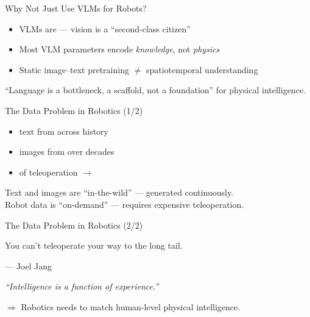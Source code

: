 \begin{frame}{Why Not Just Use VLMs for Robots?}
\begin{itemize}
    \item VLMs are  ---
          vision is a ``second-class citizen''
    \item Most VLM parameters encode \emph{knowledge},
          not \emph{physics}
    \item Static image--text pretraining
          $\neq$ spatiotemporal understanding
\end{itemize}

\vspace{0.5em}
\begin{softbox}
 ``Language is a bottleneck, a scaffold,
not a foundation'' for physical intelligence.
\end{softbox}
\end{frame}

\begin{frame}{The Data Problem in Robotics (1/2)}
\begin{itemize}
    \item {} text from 
          across history
    \item {} images from 
          over decades
    \item {} 
          of teleoperation $\rightarrow$ 
\end{itemize}

\vspace{0.5em}
\begin{highlightbox}
Text and images are ``in-the-wild'' --- generated continuously.\\
Robot data is ``on-demand'' --- requires expensive teleoperation.
\end{highlightbox}
\end{frame}

\begin{frame}{The Data Problem in Robotics (2/2)}
\begin{quotebox}
You can't teleoperate your way to the long tail.
\end{quotebox}
\hfill --- Joel Jang \citep{jang2026worldmodels}

\vspace{0.5em}
\emph{``Intelligence is a function of experience.''}

\vspace{0.5em}
$\Rightarrow$ Robotics needs 
to match human-level physical intelligence.
\end{frame}

